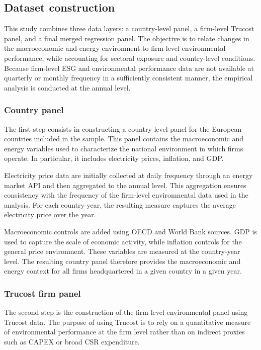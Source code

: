 \subsection{Dataset construction}

\noindent
This study combines three data layers: a country-level panel, a firm-level Trucost panel, and a final merged regression panel. The objective is to relate changes in the macroeconomic and energy environment to firm-level environmental performance, while accounting for sectoral exposure and country-level conditions. Because firm-level ESG and environmental performance data are not available at quarterly or monthly frequency in a sufficiently consistent manner, the empirical analysis is conducted at the annual level.

\subsubsection{Country panel}

\noindent
The first step consists in constructing a country-level panel for the European countries included in the sample. This panel contains the macroeconomic and energy variables used to characterize the national environment in which firms operate. In particular, it includes electricity prices, inflation, and GDP.

\noindent
Electricity price data are initially collected at daily frequency through an energy market API and then aggregated to the annual level. This aggregation ensures consistency with the frequency of the firm-level environmental data used in the analysis. For each country-year, the resulting measure captures the average electricity price over the year.

\noindent
Macroeconomic controls are added using OECD and World Bank sources. GDP is used to capture the scale of economic activity, while inflation controls for the general price environment. These variables are measured at the country-year level. The resulting country panel therefore provides the macroeconomic and energy context for all firms headquartered in a given country in a given year.

\subsubsection{Trucost firm panel}

\noindent
The second step is the construction of the firm-level environmental panel using Trucost data. The purpose of using Trucost is to rely on a quantitative measure of environmental performance at the firm level rather than on indirect proxies such as CAPEX or broad CSR expenditure.

